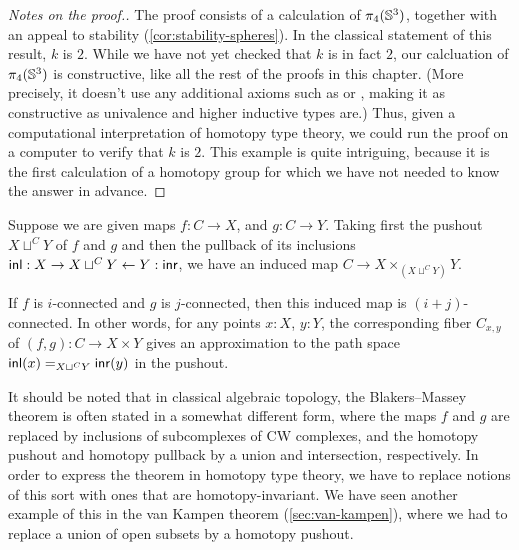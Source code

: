 \begin{proof}[Notes on the proof.]
The proof consists of a calculation of $\pi_4(\Sn ^3)$, together with an
appeal to stability (\cref{cor:stability-spheres}).  In the classical
statement of this result, $k$ is $2$.  While we have not yet checked that
$k$ is in fact $2$, our calcluation of $\pi_4(\Sn ^3)$ is constructive,
like all the rest of the proofs in this chapter.
(More precisely, it doesn't use any additional axioms such as \LEM{} or \choice{}, making it as constructive as
univalence and higher inductive types are.)  Thus, given a
computational interpretation of homotopy type theory, we could run the
proof on a computer to verify that $k$ is $2$.  This example is quite
intriguing, because it is the first calculation of a homotopy group
for which we have not needed to know the answer in advance.
\end{proof}

%

\begin{thm}\label{Blakers-Massey}
  Suppose we are given maps $f : C  \rightarrow X$, and $g : C \rightarrow Y$. Taking first the pushout $X \sqcup^C Y $ of $f$ and $g$ and then the pullback of its inclusions $\inl : X \rightarrow X \sqcup^C Y \leftarrow Y : \inr$, we have an induced map $C \to X \times_{(X \sqcup^C Y)} Y$.

  If $f$ is $i$-connected and $g$ is $j$-connected, then this induced map is $(i+j)$-connected. In other words, for any points $x:X$, $y:Y$, the corresponding fiber $C_{x,y}$ of $(f,g) : C \to X \times Y $ gives an approximation to the path space $\id[X \sqcup^C Y]{\inl(x)}{\inr(y)}$ in the pushout.
\end{thm}

It should be noted that in classical algebraic topology, the Blakers--Massey theorem is often stated in a somewhat different form, where the maps $f$ and $g$ are replaced by inclusions of subcomplexes of CW complexes, and the homotopy pushout and homotopy pullback by a union and intersection, respectively.
In order to express the theorem in homotopy type theory, we have to replace notions of this sort with ones that are homotopy-invariant.
We have seen another example of this in the van Kampen theorem (\autoref{sec:van-kampen}), where we had to replace a union of open subsets by a homotopy pushout.

